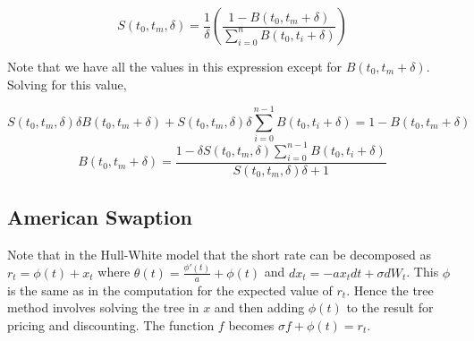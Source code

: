 \documentclass{article}
\theoremstyle{definition}
\begin{document}
\[S(t_0, t_m, \delta)=\frac{1}{\delta}\left(\frac{1-B(t_0, t_m+\delta)}{\sum_{i=0}^n B(t_0, t_i+\delta)}\right)\]

Note that we have all the values in this expression except for \(B(t_0, t_m+\delta)\).  Solving for this value,

\[S(t_0, t_m, \delta)\delta B(t_0, t_m+\delta)+ S(t_0, t_m, \delta)\delta\sum_{i=0}^{n-1} B(t_0, t_i+\delta)=1-B(t_0, t_m+\delta)\]
\[B(t_0, t_m+\delta)=\frac{1-\delta S(t_0, t_m, \delta)\sum_{i=0}^{n-1} B(t_0, t_i+\delta)}{S(t_0, t_m, \delta)\delta+1}\]


\subsection{American Swaption}

Note that in the Hull-White model that the short rate can be decomposed as \(r_t=\phi(t)+x_t\) where \(\theta(t)=\frac{\phi'(t)}{a}+\phi(t)\) and \(dx_t=-ax_t dt+\sigma dW_t\).  This \(\phi\) is the same as in the computation for the expected value of \(r_t\).  Hence the tree method involves solving the tree in \(x\) and then adding \(\phi(t)\) to the result for pricing and discounting.  The function \(f\) becomes \(\sigma f+\phi(t)=r_t\).
\end{document}
